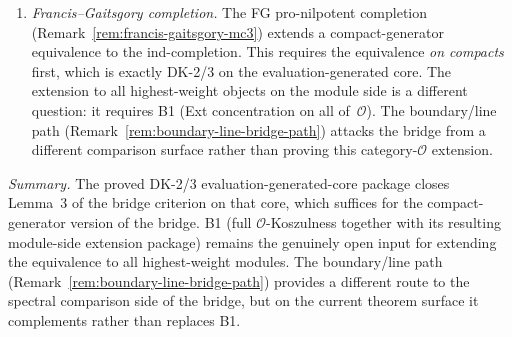 \begin{remark}
\begin{enumerate}[label=\textup{(\roman*)}]
\item \emph{Francis--Gaitsgory completion.}
 The FG pro-nilpotent completion
 (Remark~\ref{rem:francis-gaitsgory-mc3}) extends a
 compact-generator equivalence to the ind-completion. This
 requires the equivalence \emph{on compacts} first, which is
 exactly DK-2/3 on the evaluation-generated core. The extension
 to all highest-weight objects on the module side is a different
 question: it requires B1 (Ext concentration on all of~$\mathcal{O}$).
 The boundary/line path
 (Remark~\ref{rem:boundary-line-bridge-path}) attacks the bridge from
 a different comparison surface rather than proving this
 category-$\mathcal{O}$ extension.
\end{enumerate}

\noindent
\emph{Summary.} The proved DK-2/3 evaluation-generated-core package
closes Lemma~3 of the bridge criterion on that core, which suffices
for the compact-generator version of the bridge. B1 (full
$\mathcal{O}$-Koszulness together with its resulting module-side
extension package) remains the genuinely open input for extending the
equivalence to all highest-weight modules. The
boundary/line path (Remark~\ref{rem:boundary-line-bridge-path})
provides a different route to the spectral comparison side of the
bridge, but on the current theorem surface it complements rather than
replaces B1.
\end{remark}

